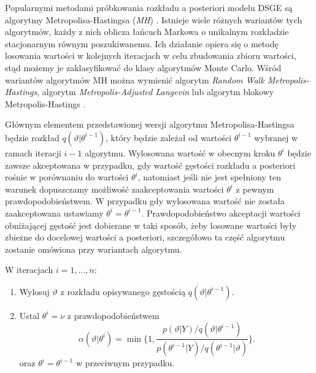 Popularnymi metodami próbkowania rozkładu a posteriori modelu DSGE są algorytmy Metropolisa-Hastingsa (\emph{MH}) \cite{herbst}. Istnieje wiele różnych wariantów tych algorytmów, każdy z nich oblicza łańcuch Markowa o unikalnym rozkładzie stacjonarnym równym poszukiwanemu.  Ich działanie opiera się o metodę losowania wartości w kolejnych iteracjach w celu zbudowania zbioru wartości, stąd możemy je zaklasyfikować do klasy algorytmów Monte Carlo. Wśród wariantów algorytmów MH można wymienić algorytm \emph{Random Walk Metropolis-Hastings}, algorytm \emph{Metropolis-Adjusted Langevin} \cite{herbst} lub algorytm blokowy Metropolis-Hastings \cite{NBERw15774}.

Głównym elementem przedstawionej wersji algorytmu Metropolisa-Hastingsa będzie rozkład $q(\vartheta|\theta^{i-1})$, który będzie zależał od wartości $\theta^{i-1}$ wybranej w ramach iteracji $i-1$ algorytmu. Wylosowana wartość w obecnym kroku $\theta^i$ będzie zawsze akceptowana w przypadku, gdy wartość gęstości rozkładu a posteriori rośnie w porównaniu do wartości $\theta^i$, natomiast jeśli nie jest spełniony ten warunek dopuszczamy możliwość zaakceptowania wartości $\theta^i$ z pewnym prawdopodobieństwem. W przypadku gdy wylosowana wartość nie została zaakceptowana ustawiamy $\theta^i = \theta^{i-1}$. Prawdopodobieństwo akceptacji wartości obniżającej gęstość jest dobierane w taki sposób, żeby losowane wartości były zbieżne do docelowej wartości a posteriori, szczegółowo ta część algorytmu zostanie omówiona przy wariantach algorytmu.

\begin{algDefinition}
    W iteracjach $i = 1, \dots, n$:
    \begin{enumerate}
        \item Wylosuj $\vartheta$ z rozkładu opisywanego gęstością $q(\vartheta|\theta^{i-1})$.
        \item Ustal $\theta^i = \nu$ z prawdopodobieństwem
            \begin{equation}
                \label{eqn:mhalpha}
                \alpha(\vartheta|\theta^i) = \min \{ 1, \frac{p(\vartheta|Y)/q(\vartheta|\theta^{i-1})}{p(\theta^{i-1}|Y)/q(\theta^{i-1}|\vartheta)}\}.
            \end{equation}
            oraz $\theta^i = \theta^{i-1}$ w przeciwnym przypadku.
    \end{enumerate}
    
\end{algDefinition}

